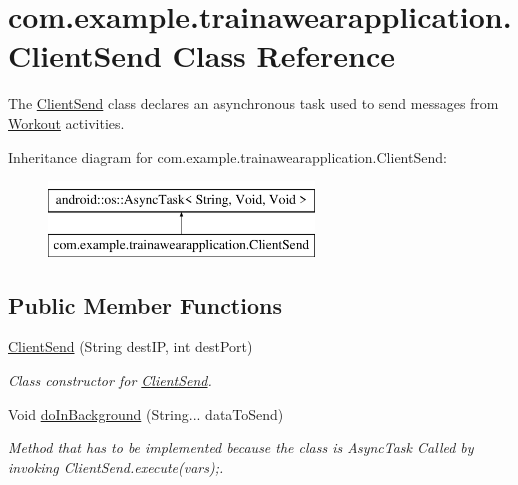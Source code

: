 \hypertarget{classcom_1_1example_1_1trainawearapplication_1_1_client_send}{}\section{com.\+example.\+trainawearapplication.\+Client\+Send Class Reference}
\label{classcom_1_1example_1_1trainawearapplication_1_1_client_send}


The \mbox{\hyperlink{classcom_1_1example_1_1trainawearapplication_1_1_client_send}{Client\+Send}} class declares an asynchronous task used to send messages from \mbox{\hyperlink{classcom_1_1example_1_1trainawearapplication_1_1_workout}{Workout}} activities.  


Inheritance diagram for com.\+example.\+trainawearapplication.\+Client\+Send\+:\begin{figure}[H]
\begin{center}
\leavevmode
\includegraphics[height=2.000000cm]{classcom_1_1example_1_1trainawearapplication_1_1_client_send}
\end{center}
\end{figure}
\subsection*{Public Member Functions}
\begin{DoxyCompactItemize}
\item 
\mbox{\hyperlink{classcom_1_1example_1_1trainawearapplication_1_1_client_send_ab1f011085d4305f586a7074a46e73450}{Client\+Send}} (String dest\+IP, int dest\+Port)
\begin{DoxyCompactList}\small\item\em Class constructor for \mbox{\hyperlink{classcom_1_1example_1_1trainawearapplication_1_1_client_send}{Client\+Send}}. \end{DoxyCompactList}\item 
Void \mbox{\hyperlink{classcom_1_1example_1_1trainawearapplication_1_1_client_send_ad8e0bcd2078b23e83c1060065834ae7d}{do\+In\+Background}} (String... data\+To\+Send)
\begin{DoxyCompactList}\small\item\em Method that has to be implemented because the class is Async\+Task Called by invoking Client\+Send.\+execute(vars);. \end{DoxyCompactList}\end{DoxyCompactItemize}
